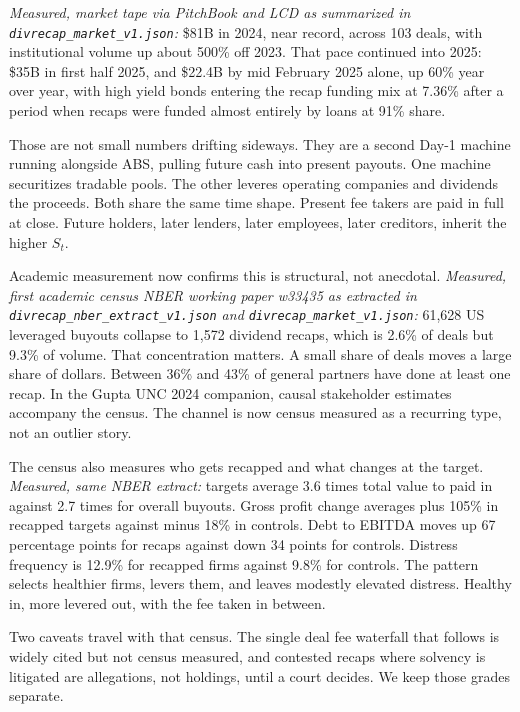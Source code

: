 \textit{Measured, market tape via PitchBook and LCD as summarized in \texttt{divrecap\_market\_v1.json}:} \$81B in 2024, near record, across 103 deals, with institutional volume up about 500\% off 2023. That pace continued into 2025: \$35B in first half 2025, and \$22.4B by mid February 2025 alone, up 60\% year over year, with high yield bonds entering the recap funding mix at 7.36\% after a period when recaps were funded almost entirely by loans at 91\% share.

Those are not small numbers drifting sideways. They are a second Day-1 machine running alongside ABS, pulling future cash into present payouts. One machine securitizes tradable pools. The other leveres operating companies and dividends the proceeds. Both share the same time shape. Present fee takers are paid in full at close. Future holders, later lenders, later employees, later creditors, inherit the higher $S_t$.

Academic measurement now confirms this is structural, not anecdotal. \textit{Measured, first academic census NBER working paper w33435 as extracted in \texttt{divrecap\_nber\_extract\_v1.json} and \texttt{divrecap\_market\_v1.json}:} 61,628 US leveraged buyouts collapse to 1,572 dividend recaps, which is 2.6\% of deals but 9.3\% of volume. That concentration matters. A small share of deals moves a large share of dollars. Between 36\% and 43\% of general partners have done at least one recap. In the Gupta UNC 2024 companion, causal stakeholder estimates accompany the census. The channel is now census measured as a recurring type, not an outlier story.

The census also measures who gets recapped and what changes at the target. \textit{Measured, same NBER extract:} targets average 3.6 times total value to paid in against 2.7 times for overall buyouts. Gross profit change averages plus 105\% in recapped targets against minus 18\% in controls. Debt to EBITDA moves up 67 percentage points for recaps against down 34 points for controls. Distress frequency is 12.9\% for recapped firms against 9.8\% for controls. The pattern selects healthier firms, levers them, and leaves modestly elevated distress. Healthy in, more levered out, with the fee taken in between.

Two caveats travel with that census. The single deal fee waterfall that follows is widely cited but not census measured, and contested recaps where solvency is litigated are allegations, not holdings, until a court decides. We keep those grades separate.

